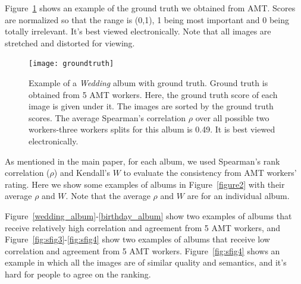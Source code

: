 \documentclass[10pt,twocolumn,letterpaper]{article}
\begin{document}
Figure~\ref{album_figure2} shows an example of the ground truth we obtained from AMT. Scores are normalized so that the range is (0,1), 1 being most important and 0 being totally irrelevant. It's best viewed electronically. Note that all images are stretched and distorted for viewing.

\begin{figure}[ht]
\texttt{[image: groundtruth]}
\caption{Example of a \textit{Wedding} album with ground truth. Ground truth is obtained from 5 AMT workers. Here, the ground truth score of each image is given under it. The images are sorted by the ground truth scores. The average Spearman's correlation $\rho$ over all possible two workers-three workers splits for this album is 0.49. It is best viewed electronically.}
\label{album_figure2}
\end{figure}



As mentioned in the main paper, for each album, we used Spearman's rank correlation ($\rho$) and Kendall's $W$ to evaluate the consistency from AMT workers' rating. Here we show some examples of albums in Figure~\ref{figure2} with their average $\rho$ and $W$. Note that the average $\rho$ and $W$ are for an individual album.

Figure~\ref{wedding_album}-\ref{birthday_album} show two examples of albums that receive relatively high correlation and agreement from 5 AMT workers, and Figure~\ref{fig:sfig3}-\ref{fig:sfig4} show two examples of albums that receive low correlation and agreement from 5 AMT workers. Figure~\ref{fig:sfig4} shows an example in which all the images are of similar quality and semantics, and it's hard for people to agree on the ranking.
\end{document}
